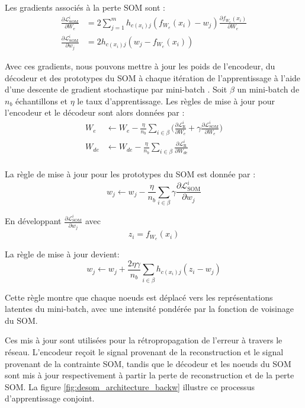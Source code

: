 \documentclass[12pt,a4paper]{report}
\begin{document}
Les gradients associés à la perte SOM sont :
\begin{align*}
\frac{\partial \mathcal{L}_{\text{SOM}}^i}{\partial W_e} &= 2 \sum_{j=1}^{m} h_{c(x_i) j} (f_{W_e}(x_i) - w_j) \frac{\partial f_{W_e}(x_i)}{\partial W_e} \\
\frac{\partial \mathcal{L}_{\text{SOM}}^i}{\partial w_j} &= 2 h_{c(x_i) j} (w_j - f_{W_e}(x_i))
\end{align*} 

Avec ces gradients, nous pouvons mettre à jour les poids de l'encodeur, du décodeur et des prototypes du SOM à chaque itération de l'apprentissage 
à l'aide d'une descente de gradient stochastique par mini-batch \cite{DESOM}. Soit $\beta$ un mini-batch de $n_b$ échantillons et $\eta$ le taux d'apprentissage. 
Les règles de mise à jour pour l'encodeur et le décodeur sont alors données par :
\begin{align*}
W_e &\leftarrow W_e - \frac{\eta}{n_b} \sum_{i \in \beta} \bigg(\frac{\partial \mathcal{L}_{\text{R}}^i}{\partial W_e} + \gamma \frac{\partial \mathcal{L}_{\text{SOM}}^i}{\partial W_e}\bigg) \\
W_{de} &\leftarrow W_{de} - \frac{\eta}{n_b} \sum_{i \in \beta} \frac{\partial \mathcal{L}_{\text{R}}^i}{\partial W_{de}} \\
\end{align*}

La règle de mise à jour pour les prototypes du SOM est donnée par \cite{DESOM}:
$$w_j \leftarrow w_j - \frac{\eta}{n_b} \sum_{i \in \beta} \gamma \frac{\partial \mathcal{L}_{\text{SOM}}^i}{\partial w_j}$$

En développant $\frac{\partial \mathcal{L}_{\text{SOM}}^i}{\partial w_j}$ avec 
$$z_i = f_{W_e}(x_i)$$ 

La règle de mise à jour devient:
$$w_j \leftarrow w_j + \frac{2\eta\gamma}{n_b} \sum_{i \in \beta} h_{c(x_i) j} (z_i - w_j)$$

Cette règle montre que chaque noeuds est déplacé vers les représentations latentes du mini-batch, avec une intensité pondérée par la fonction de voisinage du SOM.

Ces mis à jour sont utilisées pour la rétropropagation de l'erreur à travers le réseau.
L'encodeur reçoit le signal provenant de la reconstruction et le signal provenant de la contrainte SOM, tandis que le décodeur et les noeuds du SOM sont mis à jour
respectivement à partir la perte de reconstruction et de la perte SOM. La figure \ref{fig:desom_architecture_backw} illustre ce processus d'apprentissage conjoint.
\end{document}
